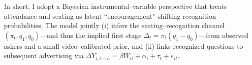 \documentclass[11pt]{article}
\begin{document}
In short, I adopt a Bayesian instrumental–variable perspective that treats attendance and seating as latent “encouragement” shifting recognition probabilities. The model jointly (i) infers the seating–recognition channel $(\pi_t,q_1,q_0)$—and thus the implied first stage $\Delta_t=\pi_t(q_1-q_0)$—from observed askers and a small video–calibrated prior, and (ii) links recognized questions to subsequent advertising via $\Delta Y_{i,t+h}=\beta W_{it}+\alpha_i+\tau_t+\varepsilon_{it}$. 
\end{document}
